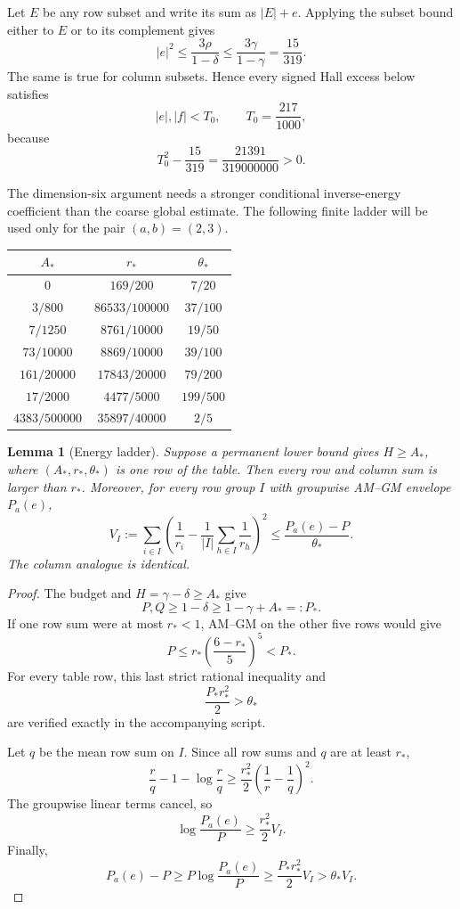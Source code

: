 \documentclass[11pt]{article}
\newtheorem{lemma}[theorem]{Lemma}
\theoremstyle{definition}
\begin{document}
Let $E$ be any row subset and write its sum as $|E|+e$.  Applying the subset
bound either to $E$ or to its complement gives
\[
 |e|^2\le\frac{3\rho}{1-\delta}
 \le\frac{3\gamma}{1-\gamma}=\frac{15}{319}.
\]
The same is true for column subsets.  Hence every signed Hall excess below
satisfies
\[
 |e|,|f|<T_0,
 \qquad
 T_0=\frac{217}{1000},
 \tag{3.4}\label{eq:signed-box}
\]
because
\[
 T_0^2-\frac{15}{319}=\frac{21391}{319000000}>0.
\]

The dimension-six argument needs a stronger conditional inverse-energy
coefficient than the coarse global estimate.  The following finite ladder
will be used only for the pair $(a,b)=(2,3)$.

\begin{center}
\begin{tabular}{c|c|c}
\toprule
$A_*$&$r_*$&$\theta_*$\\
\midrule
$0$&$169/200$&$7/20$\\
$3/800$&$86533/100000$&$37/100$\\
$7/1250$&$8761/10000$&$19/50$\\
$73/10000$&$8869/10000$&$39/100$\\
$161/20000$&$17843/20000$&$79/200$\\
$17/2000$&$4477/5000$&$199/500$\\
$4383/500000$&$35897/40000$&$2/5$\\
\bottomrule
\end{tabular}
\end{center}

\begin{lemma}[Energy ladder]\label{lem:energy-ladder}
Suppose a permanent lower bound gives $H\ge A_*$, where $(A_*,r_*,\theta_*)$
is one row of the table.  Then every row and column sum is larger than $r_*$.
Moreover, for every row group $I$ with groupwise AM--GM envelope $P_a(e)$,
\[
 V_I:=\sum_{i\in I}\left(
 \frac1{r_i}-\frac1{|I|}\sum_{h\in I}\frac1{r_h}
 \right)^2
 \le\frac{P_a(e)-P}{\theta_*}.
 \tag{3.5}\label{eq:conditional-energy-tier}
\]
The column analogue is identical.
\end{lemma}

\begin{proof}
The budget and $H=\gamma-\delta\ge A_*$ give
\[
 P,Q\ge1-\delta\ge1-\gamma+A_*=:P_*.
 \tag{3.6}\label{eq:Pstar}
\]
If one row sum were at most $r_*<1$, AM--GM on the other five rows would give
\[
 P\le r_*\left(\frac{6-r_*}{5}\right)^5<P_*.
\]
For every table row, this last strict rational inequality and
\[
 \frac{P_*r_*^2}{2}>\theta_*
 \tag{3.7}\label{eq:energy-table-check}
\]
are verified exactly in the accompanying script.

Let $q$ be the mean row sum on $I$.  Since all row sums and $q$ are at least
$r_*$,
\[
 \frac rq-1-\log\frac rq
 \ge\frac{r_*^2}{2}\left(\frac1r-\frac1q\right)^2.
 \tag{3.8}\label{eq:scalar-energy}
\]
The groupwise linear terms cancel, so
\[
 \log\frac{P_a(e)}P\ge\frac{r_*^2}{2}V_I.
\]
Finally,
\[
 P_a(e)-P\ge P\log\frac{P_a(e)}P
 \ge\frac{P_*r_*^2}{2}V_I>\theta_*V_I.
\]
\end{proof}
\end{document}
